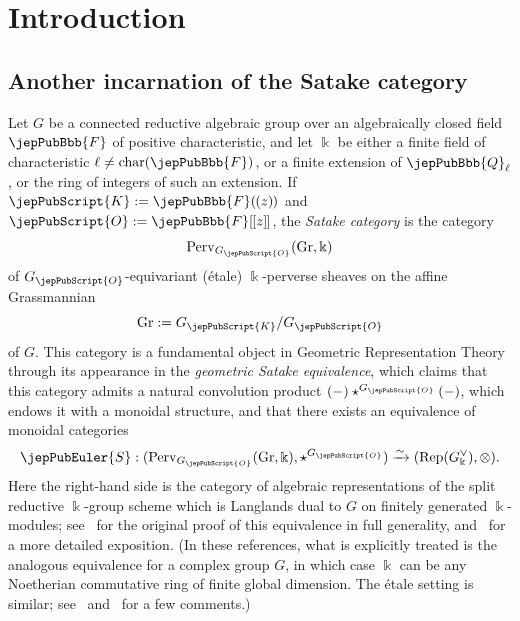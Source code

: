 \section{Introduction}

\subsection{Another incarnation of the Satake category}

Let $G$ be a connected reductive algebraic group over an algebraically closed field $\jepPubBbb{F}$ of positive characteristic, and let $\Bbbk$ be either a finite field of characteristic $\ell \neq \mathrm{char}(\jepPubBbb{F})$, or a finite extension of $\jepPubBbb{Q}_\ell$, or the ring of integers of such an extension. If $\jepPubScript{K}:=\jepPubBbb{F}( \hspace{-0.5pt} (z) \hspace{-0.5pt} )$ and $\jepPubScript{O}:= \jepPubBbb{F}[ \hspace{-0.5pt} [z] \hspace{-0.5pt} ]$, the \emph{Satake category} is the category
\[
 \mathrm{Perv}_{G_{\jepPubScript{O}}}(\mathrm{Gr},\Bbbk)
\]
of $G_{\jepPubScript{O}}$-equivariant (\'etale) $\Bbbk$-perverse sheaves on the affine Grassmannian
\[
 \mathrm{Gr}:=G_{\jepPubScript{K}}/G_{\jepPubScript{O}}
\]
of $G$. This category is a fundamental object in Geometric Representation Theory through its appearance in the \emph{geometric Satake equivalence}, which claims that this category admits a natural convolution product $(-) \star^{G_{\jepPubScript{O}}} (-)$, which endows it with a monoidal structure, and that there exists an equivalence of monoidal categories
\begin{equation}
\label{jep104local006}
 \jepPubEuler{S} : (\mathrm{Perv}_{G_{\jepPubScript{O}}}(\mathrm{Gr},\Bbbk), \star^{G_{\jepPubScript{O}}}) \xrightarrow{\sim} (\mathrm{Rep}(G^\vee_\Bbbk), \otimes).
\end{equation}
Here the right-hand side is the category of algebraic representations of the split reductive $\Bbbk$-group scheme which is Langlands dual to $G$ on finitely generated $\Bbbk$-modules; see~\cite{jep104ref36} for the original proof of this equivalence in full generality, and~\cite{jep104ref11} for a more detailed exposition. (In these references, what is explicitly treated is the analogous equivalence for a complex group $G$, in which case $\Bbbk$ can be any Noetherian commutative ring of finite global dimension. The \'etale setting is similar; see~\cite[\S 14]{jep104ref36} and~\cite[\S 1.1.4]{jep104ref11} for a few comments.)

